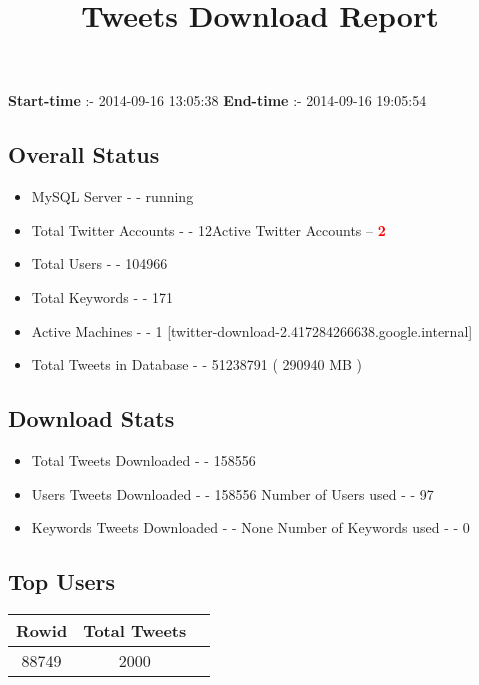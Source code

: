 \documentclass{article}\usepackage[T1]{fontenc}
\begin{document}
\title{\textbf{Tweets Download Report}}
               \date{}
                \maketitle
               \centerline{\textbf{Start-time} :- 2014-09-16 13:05:38 \hspace{40pt} \textbf{End-time} :- 2014-09-16 19:05:54}               \subsection*{Overall Status}                \begin{itemize}                \item MySQL Server - - running               \item Total Twitter Accounts - - 12\newline Active Twitter Accounts -- \textcolor{red}{\textbf{2}}               \item Total Users - - 104966               \item Total Keywords - - 171               \item Active Machines - - 1 [twitter-download-2.417284266638.google.internal]               \item Total Tweets in Database - - 51238791 ( 290940 MB )               \end{itemize}               \subsection*{Download Stats}                \begin{itemize}                \item Total Tweets Downloaded - - 158556               \item Users Tweets Downloaded - - 158556 \newline Number of Users used - - 97               \item Keywords Tweets Downloaded - - None \newline Number of Keywords used - - 0              \end{itemize}              \subsection*{Top Users}\begin{tabular}{|c|c|c|}         \hline         Rowid & Total Tweets \\ 
 \hline
88749 & 2000\\ 

\end{tabular}
\end{document}
